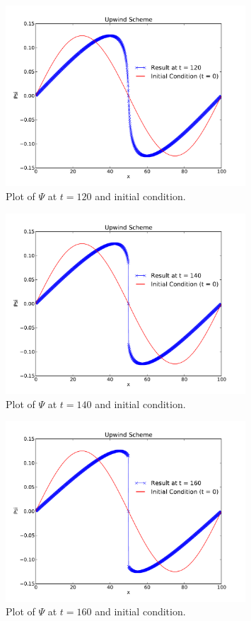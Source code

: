 \documentclass[11pt,letterpaper]{article}
\begin{document}
\begin{figure}[bth]
\centering
\includegraphics[width=0.80\textwidth]{t=120.pdf}
\caption{Plot of $\Psi$ at $t = 120$ and initial condition.}
\label{fig:t=120}
\end{figure}

\begin{figure}[bth]
\centering
\includegraphics[width=0.80\textwidth]{t=140.pdf}
\caption{Plot of $\Psi$ at $t = 140$ and initial condition.}
\label{fig:t=140}
\end{figure}

\begin{figure}[bth]
\centering
\includegraphics[width=0.80\textwidth]{t=160.pdf}
\caption{Plot of $\Psi$ at $t = 160$ and initial condition.}
\label{fig:t=160}
\end{figure}
\end{document}
